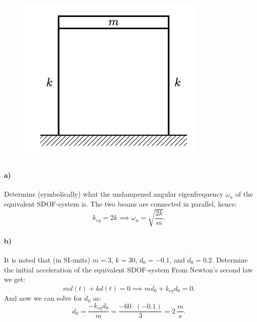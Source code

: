 \begin{figure} [ht]
  \centering
  \includegraphics[width=0.5\linewidth]{./figures/f2_3.png}
\end{figure}

\paragraph{a)}
Determine (symbolically) what the undampened angular eigenfrequency $\omega_u$ of the equivalent SDOF-system is.
\bigbreak
The two beams are connected in parallel, hence:
\[ 
k_{eq} = 2k \implies \omega_u = \sqrt{\frac{2k}{m}}
.\]


\paragraph{b)}
It is noted that (in SI-units) $m = 3$, $k = 30$, $d_0 = -\num{0,1}$, and $\dot{d}_0 = \num{0,2}$. Determine the initial acceleration of the equivalent SDOF-system
\bigbreak
From Newton's second law we get:
\[ 
m \ddot{d}(t) + k d(t) = 0 \implies m \ddot{d}_0 + k_{eq} d_0 = 0
.\]
And now we can solve for $\ddot{d}_0$ as:
\[ 
\ddot{d}_0 = \frac{- k_{eq} d_0}{m} = \frac{- 60 \cdot (- \num{0,1})}{3} = \qty{2}{\frac{m}{s}} 
.\]

